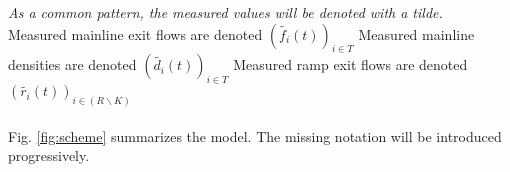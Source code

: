 \emph{As a common pattern, the measured values will be denoted with a tilde.}\\
Measured mainline exit flows are denoted $(\widetilde{f_{i}}(t))_{i\in{T}}$
Measured mainline densities are denoted $(\widetilde{d_{i}}(t))_{i\in{T}}$
Measured ramp exit flows are denoted $(\widetilde{r_{i}}(t))_{i\in{(R\backslash K)}}$\\
\\
Fig.	 \ref{fig:scheme} summarizes the model. The missing notation will be introduced progressively. \\


